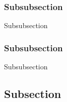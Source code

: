 \documentclass[a4paper]{report}
\begin{document}
\subsubsection{Subsubsection}

{Subsubsection

}
\subsubsection{Subsubsection}

{ Subsubsection



}
\newpage
\subsection{Subsection}
\end{document}
